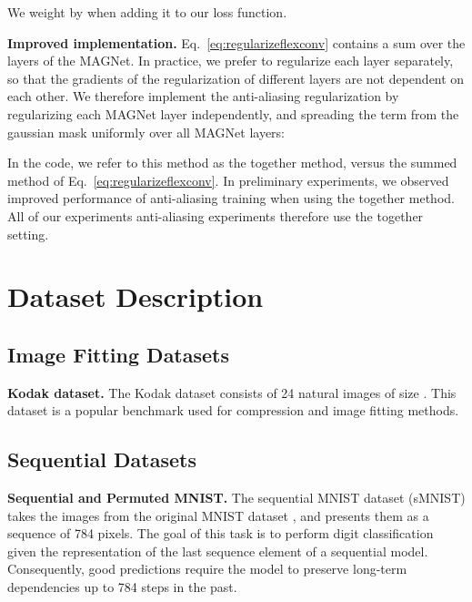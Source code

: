 \documentclass{article} \usepackage{iclr2022_conference,times}
\begin{document}
We weight  by  when adding it to our loss function.

\textbf{Improved implementation.} Eq.~\ref{eq:regularizeflexconv} contains a sum over the  layers of the MAGNet. In practice, we prefer to regularize each layer  separately, so that the gradients of the regularization of different layers are not dependent on each other. We therefore implement the anti-aliasing regularization by regularizing each MAGNet layer independently, and spreading the  term from the gaussian mask uniformly over all MAGNet layers:



In the code, we refer to this method as the {\btt together} method, versus the {\btt summed} method of Eq.~\ref{eq:regularizeflexconv}. In preliminary experiments, we observed improved performance of anti-aliasing training when using the {\btt together} method. All of our experiments anti-aliasing experiments therefore use the {\btt together} setting.













\section{Dataset Description}
\label{sec:datasets}

\subsection{Image Fitting Datasets}
\textbf{Kodak dataset.} The Kodak dataset \citep{kodak1991} consists of 24 natural images of size . This dataset is a popular benchmark used for compression and image fitting methods.

\subsection{Sequential Datasets}
\textbf{Sequential and Permuted MNIST.} The sequential MNIST dataset (sMNIST) \citep{le2015simple}takes the  images from the original MNIST dataset \citep{lecun1998gradient}, and presents them as a sequence of 784 pixels. The goal of this task is to perform digit classification given the representation of the last sequence element of a sequential model. Consequently, good predictions require the model to preserve long-term dependencies up to 784 steps in the past.
\end{document}
